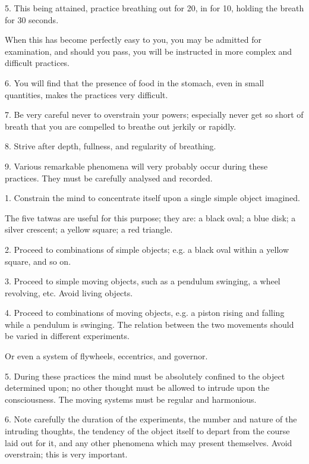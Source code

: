 5. This being attained, practice breathing out for 20, in for 10, holding the breath for 30 seconds.

When this has become perfectly easy to you, you may be admitted for examination, and should you pass, you will be instructed in more complex and difficult practices.

6. You will find that the presence of food in the stomach, even in small quantities, makes the practices very difficult.

7. Be very careful never to overstrain your powers; especially never get so short of breath that you are compelled to breathe out jerkily or rapidly.

8. Strive after depth, fullness, and regularity of breathing.

9. Various remarkable phenomena will very probably occur during these practices. They must be carefully analysed and recorded.



1. Constrain the mind to concentrate itself upon a single simple object imagined.

The five tatwas are useful for this purpose; they are: a black oval; a blue disk; a silver crescent; a yellow square; a red triangle.

2. Proceed to combinations of simple objects; e.g. a black oval within a yellow square, and so on.

3. Proceed to simple moving objects, such as a pendulum swinging, a wheel revolving, etc. Avoid living objects.

4. Proceed to combinations of moving objects, e.g. a piston rising and falling while a pendulum is swinging. The relation between the two movements should be varied in different experiments.

Or even a system of flywheels, eccentrics, and governor.

5. During these practices the mind must be absolutely confined to the object determined upon; no other thought must be allowed to intrude upon the consciousness. The moving systems must be regular and harmonious.

6. Note carefully the duration of the experiments, the number and nature of the intruding thoughts, the tendency of the object itself to depart from the course laid out for it, and any other phenomena which may present themselves. Avoid overstrain; this is very important.

